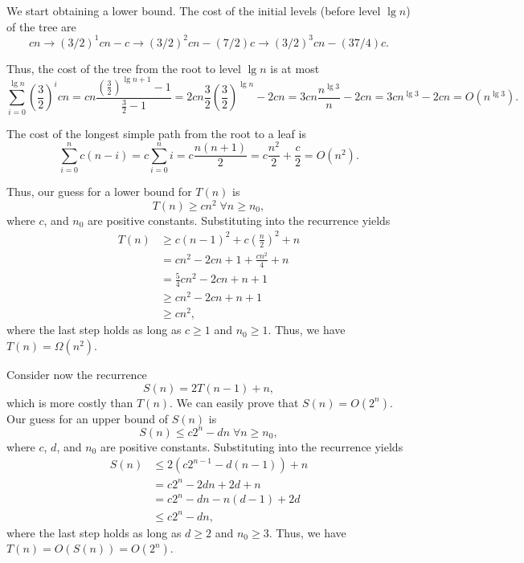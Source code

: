 \documentclass{report}
\makeatletter
\renewenvironment{framed}{%
 \def\FrameCommand##1{\hskip\@totalleftmargin
 \fboxsep=\FrameSep\fbox{##1}}%
 \MakeFramed {\advance\hsize-\width
   \@totalleftmargin\z@ \linewidth\hsize
   \@setminipage}}%
 {\par\unskip\endMakeFramed}
\DeclareMathOperator{\Forall}{\forall}
\makeatother
\begin{document}
\begin{enumerate}
\begin{framed}
We start obtaining a lower bound. The cost of the initial levels (before level
$\lg n$) of the tree are
\[
cn \rightarrow (3/2)^1 cn - c \rightarrow (3/2)^2 cn - (7/2) c \rightarrow (3/2)^3 cn - (37/4) c.
\]

Thus, the cost of the tree from the root to level $\lg n$ is at most
\[
  \sum_{i = 0}^{\lg n} \left(\frac{3}{2}\right)^i cn
  = cn \frac{\left(\frac{3}{2}\right)^{\lg n + 1} - 1}{\frac{3}{2} - 1}
  = 2cn \frac{3}{2} \left(\frac{3}{2}\right)^{\lg n} - 2cn
  = 3cn \frac{n^{\lg 3}}{n} - 2cn
  = 3cn^{\lg 3} - 2cn
  = O(n^{\lg 3}).
\]

The cost of the longest simple path from the root to a leaf is
\[
  \sum_{i = 0}^{n} c(n - i) = c \sum_{i = 0}^{n} i = c \frac{n (n + 1)}{2}
                            = c \frac{n^2}{2} + \frac{c}{2} = O(n^2).
\]

Thus, our guess for a lower bound for $T(n)$ is
\[
T(n) \ge cn^2 \; \Forall n \ge n_0,
\]
where $c$, and $n_0$ are positive constants. Substituting into the
recurrence yields
\begin{equation*}
\begin{aligned}
  T(n) &\ge c (n - 1)^2 + c\left(\frac{n}{2}\right)^2 + n\\
       &=   cn^2 - 2cn + 1 + \frac{cn^2}{4} + n\\
       &=   \frac{5}{4} cn^2 -2cn + n + 1\\
       &\ge cn^2 -2cn + n + 1\\
       &\ge cn^2,
\end{aligned}
\end{equation*}
where the last step holds as long as $c \ge 1$ and $n_0 \ge 1$. Thus, we have
$T(n) = \Omega(n^2)$.

Consider now the recurrence
\[
S(n) = 2T(n - 1) + n,
\]
which is more costly than $T(n)$. We can easily prove that $S(n) = O(2^n)$. Our
guess for an upper bound of $S(n)$ is
\[
S(n) \le c 2^n - dn \; \Forall n \ge n_0,
\]
where $c$, $d$, and $n_0$ are positive constants. Substituting into the
recurrence yields
\begin{equation*}
\begin{aligned}
  S(n) &\le 2 (c 2^{n - 1} - d(n - 1)) + n\\
       &=   c2^n - 2dn + 2d + n\\
       &=   c2^n - dn - n(d - 1) + 2d\\
       &\le c 2^n - dn,
\end{aligned}
\end{equation*}
where the last step holds as long as $d \ge 2$ and $n_0 \ge 3$. Thus, we have
$T(n) = O(S(n)) = O(2^n)$.


\end{framed}
\end{enumerate}
\end{document}
